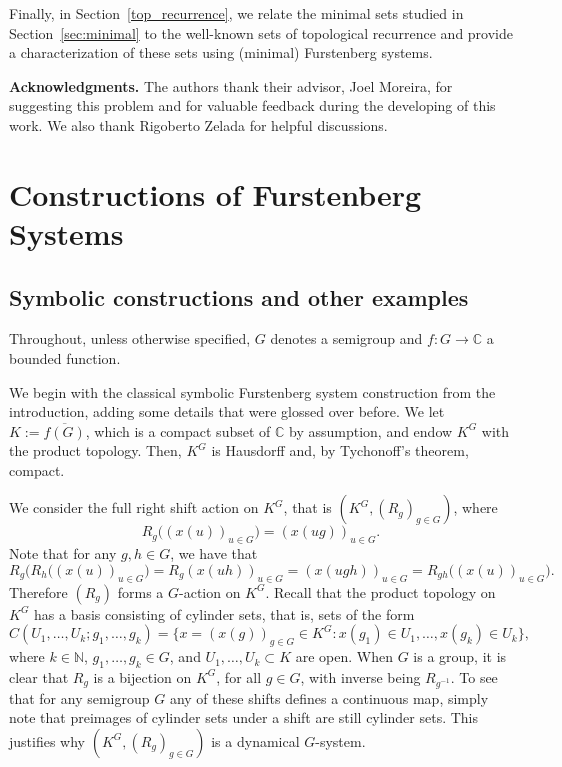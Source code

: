 \documentclass{amsart}
\numberwithin{equation}{section}
\theoremstyle{definition}
\theoremstyle{plain}
\newcommand{\C}{{\mathbb C}}
\begin{document}
Finally, in Section~\ref{top_recurrence}, we relate the 
minimal sets studied in Section~\ref{sec:minimal} to the 
well-known sets of topological recurrence and provide a 
characterization of these sets using (minimal) 
Furstenberg systems.


\textbf{Acknowledgments.} The authors thank their advisor, Joel Moreira, for 
suggesting this problem and for valuable feedback during 
the developing of this work. We also thank Rigoberto
Zelada for helpful discussions.


\section{Constructions of Furstenberg Systems}
\label{sec:2}
\subsection{Symbolic constructions and other examples}\label{sec:2.1} 

Throughout, unless otherwise specified, $G$ denotes a 
semigroup and $f:G\to \C$ a bounded function. 

We begin with the classical symbolic 
Furstenberg system construction from the introduction, 
adding some details that were glossed over before. We 
let $K := \overline{f(G)}$, which is a compact subset 
of $\mathbb{C}$ by assumption, and endow $K^G$ with 
the product topology. Then, $K^G$ is Hausdorff and, by Tychonoff's theorem, compact.

We consider the full right shift action on $K^G$, that 
is $(K^G, (R_g)_{g \in G})$, where
$$R_g\bigl((x(u))_{u \in G}\bigr) = (x(ug))_{u \in G}.$$
Note that for any $g,h\in G$, we have that
$$R_g(R_h\bigl((x(u))_{u \in G}\bigr) = R_g(x(uh))_{u \in G}=(x(ugh))_{u \in G}=R_{gh}\bigl((x(u))_{u \in G}\bigr).$$
Therefore $(R_g)$ forms a $G$-action on $K^G$.
Recall that the product topology on $K^G$ has a basis 
consisting of cylinder sets, that is, sets of the form
$$
C(U_1,\ldots,U_k; g_1,\ldots,g_k)
= \{ x = (x(g))_{g \in G} \in K^G : x(g_1) \in U_1, \ldots, x(g_k) \in U_k \},
$$
where $k \in \mathbb{N}$, $g_1,\ldots,g_k \in G$, and $U_1,\ldots,U_k \subset K$ are open. When $G$ is a group, it is clear that $R_g$ is a 
bijection on $K^G$, for all $g\in G$, with inverse being $R_{g^{-1}}$. To see that for any semigroup $G$ any of these shifts defines a continuous map, simply note that preimages of cylinder sets under a shift are still cylinder sets. This justifies why $(K^{G},(R_g)_{g\in G})$ is a dynamical $G$-system.
\end{document}
